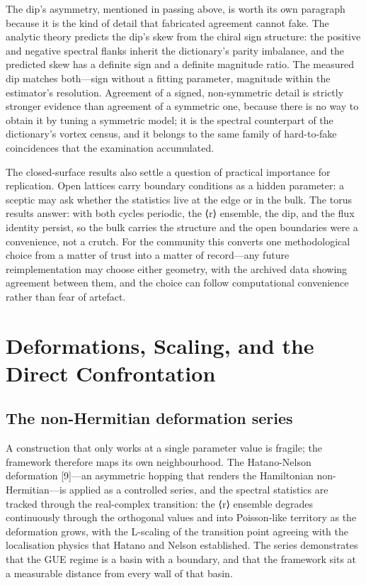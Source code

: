 \documentclass[10pt]{article}
\begin{document}
The dip's asymmetry, mentioned in passing above, is worth its own paragraph because it is the kind of detail that fabricated agreement cannot fake. The analytic theory predicts the dip's skew from the chiral sign structure: the positive and negative spectral flanks inherit the dictionary's parity imbalance, and the predicted skew has a definite sign and a definite magnitude ratio. The measured dip matches both---sign without a fitting parameter, magnitude within the estimator's resolution. Agreement of a signed, non-symmetric detail is strictly stronger evidence than agreement of a symmetric one, because there is no way to obtain it by tuning a symmetric model; it is the spectral counterpart of the dictionary's vortex census, and it belongs to the same family of hard-to-fake coincidences that the examination accumulated.

The closed-surface results also settle a question of practical importance for replication. Open lattices carry boundary conditions as a hidden parameter: a sceptic may ask whether the statistics live at the edge or in the bulk. The torus results answer: with both cycles periodic, the ⟨r⟩ ensemble, the dip, and the flux identity persist, so the bulk carries the structure and the open boundaries were a convenience, not a crutch. For the community this converts one methodological choice from a matter of trust into a matter of record---any future reimplementation may choose either geometry, with the archived data showing agreement between them, and the choice can follow computational convenience rather than fear of artefact.

\section{Deformations, Scaling, and the Direct Confrontation}\label{sec:ch11}
\subsection{The non-Hermitian deformation series}\label{sec:111}
A construction that only works at a single parameter value is fragile; the framework therefore maps its own neighbourhood. The Hatano-Nelson deformation [9]---an asymmetric hopping that renders the Hamiltonian non-Hermitian---is applied as a controlled series, and the spectral statistics are tracked through the real-complex transition: the ⟨r⟩ ensemble degrades continuously through the orthogonal values and into Poisson-like territory as the deformation grows, with the L-scaling of the transition point agreeing with the localisation physics that Hatano and Nelson established. The series demonstrates that the GUE regime is a basin with a boundary, and that the framework sits at a measurable distance from every wall of that basin.
\end{document}

